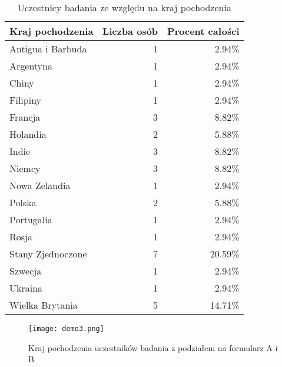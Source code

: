 \begin{table}[h!]
    \begin{center}
        \begin{tabular}{|l|r|r|}
            \hline
            Kraj pochodzenia  & Liczba osób & Procent całości \\
            \hline
            Antigua i Barbuda & 1           & 2.94\%          \\
            Argentyna         & 1           & 2.94\%          \\
            Chiny             & 1           & 2.94\%          \\
            Filipiny          & 1           & 2.94\%          \\
            Francja           & 3           & 8.82\%          \\
            Holandia          & 2           & 5.88\%          \\
            Indie             & 3           & 8.82\%          \\
            Niemcy            & 3           & 8.82\%          \\
            Nowa Zelandia     & 1           & 2.94\%          \\
            Polska            & 2           & 5.88\%          \\
            Portugalia        & 1           & 2.94\%          \\
            Rosja             & 1           & 2.94\%          \\
            Stany Zjednoczone & 7           & 20.59\%         \\
            Szwecja           & 1           & 2.94\%          \\
            Ukraina           & 1           & 2.94\%          \\
            Wielka Brytania   & 5           & 14.71\%         \\
            \hline
        \end{tabular}
    \end{center}
    \caption{Uczestnicy badania ze względu na kraj pochodzenia}\label{tab1:ch7_3}
\end{table}

\begin{figure}[h!]
    \centering
    \texttt{[image: demo3.png]}
    \caption{Kraj pochodzenia uczestników badania z podziałem na formularz A i B}
    \label{fig:ch7_demo3}
\end{figure}

